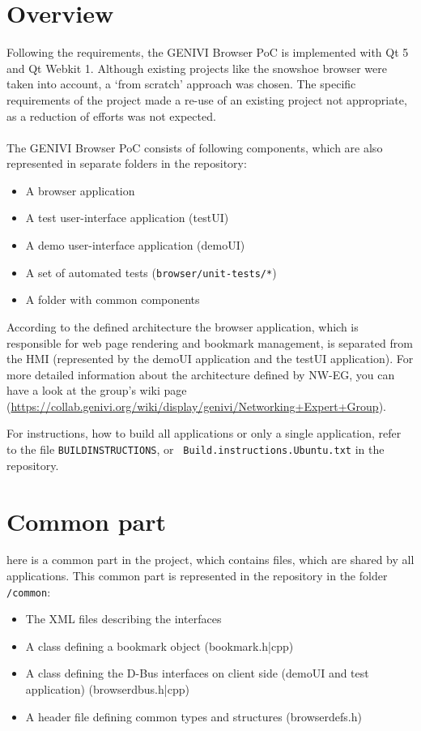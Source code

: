 \documentclass{pelagicore}
\begin{document}
\section{Overview}
Following the requirements, the GENIVI Browser PoC is implemented with Qt 5 and
Qt Webkit 1. Although existing projects like the snowshoe browser were taken
into account, a `from scratch' approach was chosen. The specific requirements
of the project made a re-use of an existing project not appropriate, as a
reduction of efforts was not expected.
\\\\
The GENIVI Browser PoC consists of following components, which are also represented in
separate folders in the repository:

\begin{itemize}
    \item A browser application
    \item A test user-interface application (testUI)
    \item A demo user-interface application (demoUI)
    \item A set of automated tests ({\tt browser/unit-tests/*})
    \item A folder with common components
\end{itemize}

According to the defined architecture the browser application, which is
responsible for web page rendering and bookmark management, is separated from
the HMI (represented by the demoUI application and the testUI application). For
more detailed information about the architecture defined by NW-EG, you can have
a look at the group's wiki page
(\url{https://collab.genivi.org/wiki/display/genivi/Networking+Expert+Group}).

For instructions, how to build all applications or only a single application,
refer to the file {\tt BUILDINSTRUCTIONS}, or {\tt
Build.instructions.Ubuntu.txt}  in the repository.

\section {Common part}
here is a common part in the project, which contains files, which are shared by
all applications. This common part is represented in the repository in the
folder {\tt /common}:

\begin{itemize}
    \item The XML files describing the interfaces
    \item A class defining a bookmark object (bookmark.h|cpp)
    \item A class defining the D-Bus interfaces on client side (demoUI and test
          application) (browserdbus.h|cpp)
    \item A header file defining common types and structures (browserdefs.h)
\end{itemize}
\end{document}
